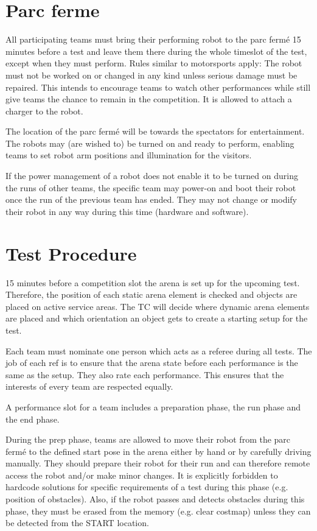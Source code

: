 \section{Parc ferme}

All participating teams must bring their performing robot to the parc fermé 15 minutes before a test and leave them there during the whole timeslot of the test, except when they must perform.
Rules similar to motorsports apply: The robot must not be worked on or changed in any kind unless
serious damage must be repaired. This intends to encourage teams to watch other performances while still give teams the chance to remain in the competition. It is allowed to attach a charger to the robot.

The location of the parc fermé will be towards the spectators for entertainment.
The robots may (are wished to) be turned on and ready to perform, enabling teams to set robot arm positions and illumination for the visitors. 

If the power management of a robot does not enable it to be turned on during the runs of other teams,
the specific team may power-on and boot their robot once the run of the previous team has ended.
They may not change or modify their robot in any way during this time (hardware and software).

\section{Test Procedure}

15 minutes before a competition slot the arena is set up for the upcoming test.
Therefore, the position of each static arena element is checked and objects are placed on active 
service areas.
The TC will decide where dynamic arena elements are placed 
and which orientation an object gets to create a starting setup for the test.
 
Each team must nominate one person which acts as a referee during all tests.
The job of each ref is to ensure that the arena state before each performance is the same as the setup.
They also rate each performance. This ensures that the interests of every team are respected equally.

A performance slot for a team includes a preparation phase, the run phase and the end phase.

During the prep phase, teams are allowed to move their robot from the parc fermé to the defined start pose in the arena either by hand or by carefully driving manually. They should prepare their robot for their run and can therefore remote access the robot and/or make minor changes.
It is explicitly forbidden to hardcode solutions for specific requirements of a test during this phase (e.g. position of obstacles). Also, if the robot passes and detects obstacles during this phase, they must be erased from the memory (e.g. clear costmap) unless they can be detected from the START location.

